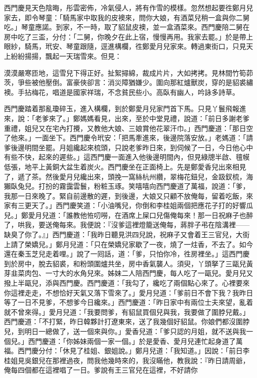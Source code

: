 西門慶見天色陰晦，彤雲密佈，冷氣侵人，將有作雪的模樣。忽然想起要徃鄭月兒家去，即令琴童：「騎馬家中取我的皮襖來，問你大娘，有酒菜兒稍一盒與你二舅吃。」琴童應諾。到家，不一時，取了貂鼠皮襖，並一盒酒菜來。西門慶陪二舅在房中吃了三盃，分付：「二舅，你晚夕在此上宿，慢慢再用。我家去罷。」於是帶上眼紗，騎馬，玳安、琴童跟隨，逕進構欄，徃鄭愛月兒家來。轉過東街口，只見天上紛紛揚揚，飄起一天瑞雪來。但見：

\begin{myquote} 
漠漠嚴寒匝地，這雪兒下得正好。扯絮撏綿，裁成片片，大如拷拷。見林間竹筍茆茨，爭些被他壓倒。富豪俠卻言：消災障猶嫌少。圍向那紅爐獸炭，穿的是貂裘繡襖。手拈梅花，唱道是國家祥瑞，不念貧民些小。高臥有幽人，吟詠多詩草。
\end{myquote} 

西門慶踏着那亂瓊碎玉，進入構欄，到於鄭愛月兒家門首下馬。只見丫鬟飛報進來，說：「老爹來了。」鄭媽媽看見，出來，至於中堂見禮，說道：「前日多謝老爹重禮，姐兒又在宅內打攪，又教他大娘、三娘賞他花翠汗巾。」西門慶道：「那日空了他來。」一面坐下。西門慶令玳安：「把馬牽進來，後邊院落安放。」老媽道：「請爹後邊明間坐罷。月姐纔起來梳頭，只說老爹昨日來，到伺候了一日，今日他心中有些不快，起來的遲些。」這西門慶一面進入他後邊明間內，但見綠牕半啟、氊幙低張，地平上黃銅大盆生着炭火。西門慶坐在正面椅上。先是鄭愛香兒出來相見了，遞了茶。然後愛月兒纔出來，頭挽一窩絲杭州纘，翠梅花鈕兒，金趿釵梳，海獺臥兔兒。打扮的霧靄雲鬟，粉粧玉琢。笑嘻嘻向西門慶道了萬福，說道：「爹，我那一日來晚了。緊自前邊散的遲，到後邊，大娘又只顧不放俺每，留着吃飯，來家有三更天了。」西門慶笑道：「小油嘴兒，你倒和李桂姐兩個把應花子打的好響瓜兒。」鄭愛月兒道：「誰教他恠叨嘮，在酒席上屎口兒傷俺每來！那一日祝麻子也醉了，哄我，要送俺每來。我便說：『沒爹這裡燈籠送俺每，蔣胖子弔在陰溝裡——缺臭了你了。』」西門慶道：「我昨日聽見洪四兒說，祝麻子又會着王三官兒，大街上請了榮嬌兒。」鄭月兒道：「只在榮嬌兒家歇了一夜，燒了一炷香，不去了。如今還在秦玉芝兒走着哩。」說了一囘話，道：「爹，只怕你冷，徃房裡坐。」這西門慶到於房中，脫去貂裘，和粉頭圍爐共坐，房中香氣襲人。須臾，丫頭拏了三甌兒黃芽韭菜肉包、一寸大的水角兒來。姊妹二人陪西門慶，每人吃了一甌兒。愛月兒又撥上半甌兒，添與西門慶。西門慶道：「我勾了，纔吃了兩個點心來了。心裡要來你這裡走走，不想恰好天氣又落下雪來了。」愛月兒道：「爹前日不會下我？我昨日等了一日不見爹，不想爹今日纔來。」西門慶道：「昨日家中有兩位士夫來望，亂着就不曾來得。」愛月兒道：「我要問爹，有貂鼠買個兒與我，我要做了圍脖兒戴。」西門慶道：「不打緊，昨日韓夥計打遼東來，送了我幾個好貂鼠。你娘們都沒圍脖兒，到明日一總做了，送一個來與你。」愛香兒道：「爹只認的月姐，就不送與我一個兒。」西門慶道：「你姊妹兩個一家一個。」{}於是愛香、愛月兒連忙起身道了萬福。西門慶分付：「休見了桂姐、銀姐說。」鄭月兒道：「我知道。」因說：「前日李桂姐見吳銀兒在那裡過夜，問我他幾時來的，我沒瞞他，教我說：『昨日請周爺，俺每四個都在這裡唱了一日。爹說有王三官兒在這裡，不好請你